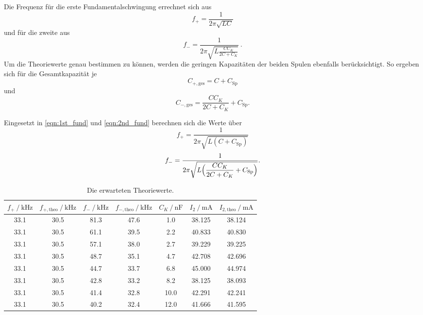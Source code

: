 Die Frequenz für die erste Fundamentalschwingung errechnet sich aus 
\begin{equation}
    \label{eqn:1st_fund}
    f_+ = \frac{1}{2\pi\sqrt{LC}}
\end{equation}
und für die zweite aus
\begin{equation}
    \label{eqn:2nd_fund}
    f_- = \frac{1}{2\pi\sqrt{L\frac{CC_K}{2C+C_K}}}\:.
\end{equation}
Um die Theoriewerte genau bestimmen zu können, werden die geringen Kapazitäten der beiden Spulen ebenfalls berücksichtigt.
So ergeben sich für die Gesamtkapazität je 
\begin{equation} %
    C_{+, \text{ges}} = C + C_\text{Sp}
\end{equation}
und
\begin{equation}
    C_{-, \text{ges}} = \frac{CC_K}{2C+C_K} + C_\text{Sp}.
\end{equation}

Eingesetzt in \eqref{eqn:1st_fund} und \eqref{eqn:2nd_fund} berechnen sich die Werte über
\begin{equation}
    \label{eqn:1st_fund_Csp}
    f_+ = \frac{1}{2\pi\sqrt{L(C + C_\text{Sp})}}
\end{equation}
\begin{equation}
    \label{eqn:2nd_fund_Csp}
    f_- = \frac{1}{2\pi\sqrt{L\Bigl(\dfrac{CC_K}{2C+C_K} + C_\text{Sp}\Bigr)}}.
\end{equation}

\begin{table}
    \centering
    \caption{Die erwarteten Theoriewerte.}
    \label{tab:theorie}
    \begin{tabular}{c c c c c c c}
        \toprule
        $f_+ \:/\: \si{\kilo\hertz}$ & $f_{+, \text{theo}} \:/\: \si{\kilo\hertz}$ & $f_- \:/\: \si{\kilo\hertz}$ & $f_{-, \text{theo}} \:/\: \si{\kilo\hertz}$ & $C_K \:/\: \si{\nano\farad}$ & $I_2 \:/\: \si{\milli\ampere}$ & $I_{2,\text{theo}} \:/\: \si{\milli\ampere}$ \\
        \midrule
        33.1 & 30.5 & 81.3 & 47.6 & 1.0  &  38.125 & 38.124 \\  
        33.1 & 30.5 & 61.1 & 39.5 & 2.2  &  40.833 & 40.830 \\
        33.1 & 30.5 & 57.1 & 38.0 & 2.7  &  39.229 & 39.225 \\
        33.1 & 30.5 & 48.7 & 35.1 & 4.7  &  42.708 & 42.696 \\
        33.1 & 30.5 & 44.7 & 33.7 & 6.8  &  45.000 & 44.974 \\
        33.1 & 30.5 & 42.8 & 33.2 & 8.2  &  38.125 & 38.093 \\
        33.1 & 30.5 & 41.4 & 32.8 & 10.0 &  42.291 & 42.241 \\
        33.1 & 30.5 & 40.2 & 32.4 & 12.0 &  41.666 & 41.595 \\
        \bottomrule
    \end{tabular}
\end{table}

\pagebreak